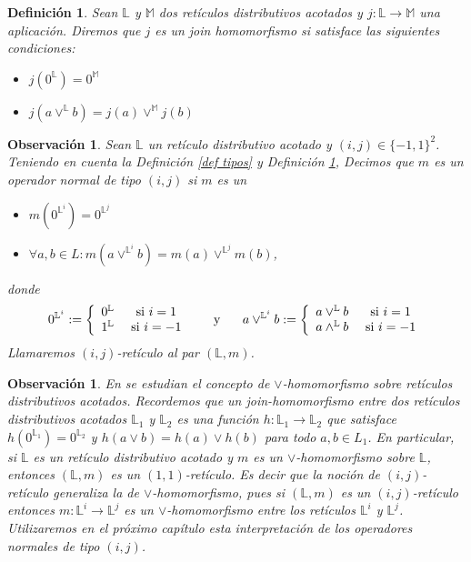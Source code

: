 \documentclass[12pt]{book}
\newtheorem{definition}[theorem]{Definición}
\newtheorem{remark}[theorem]{Observación}
\begin{document}
\begin{definition} \label{def: join homo} Sean $\mathbb{L}$ y $\mathbb{M}$ dos retículos distributivos acotados y $j \colon \mathbb{L} \to \mathbb{M}$ una aplicación. Diremos que $j$ es un \emph{join homomorfismo} si satisface las siguientes condiciones:
\begin{itemize}
\item[1.] $j(0^{\mathbb{L}}) = 0^{\mathbb{M}}$
\item[2.] $j(a \vee^{\mathbb{L}} b) = j(a) \vee^{\mathbb{M}} j(b)$
\end{itemize}
\end{definition}

\begin{remark} Sean $\mathbb{L}$ un retículo distributivo acotado y $(i,j) \in\{-1,1\}^{2}$. Teniendo en cuenta la Definición \ref{def tipos} y  Definición \ref{def: join homo}, 
Decimos que $m$ es un operador normal de tipo $(i, j)$ si $m$ es un 
\begin{itemize}
    \item[1.] $m\left(0^{\mathbb{L}^{i}}\right)=0^{\mathbb{L}^{j}}$
    \item[2.] $\forall a,b\in L: m\left(a \vee^{\mathbb{L}^{i}} b\right)= m(a) \vee^{\mathbb{L}^{j}} m(b)$,
\end{itemize}
donde 
\[ 0^{\mathbb{L}^{i}} := \left\{ \begin{array}{cc} 0^{\mathbb{L}} & \text{ si } i = 1 \\ 1^{\mathbb{L}} & \text{ si } i = -1 \end{array} \right. \hspace{0.5cm} \text{ y } \hspace{0.5cm}  a \vee^{\mathbb{L}^{i}} b := \left\{ \begin{array}{cc} a \vee^{\mathbb{L}} b & \text{ si } i = 1 \\ a \wedge^{\mathbb{L}} b & \text{ si } i = -1 \end{array} \right.  \]
Llamaremos $(i,j)$-retículo al par $(\mathbb{L},m)$.
\end{remark}

\begin{remark}\label{rem:interpretacion-ij}
En \cite{CLP} se estudian el concepto de $\vee$-homomorfismo sobre retículos distributivos acotados. Recordemos que un \emph{join-homomorfismo} entre dos retículos distributivos acotados $\mathbb{L}_1$ y $\mathbb{L}_2$ es una función $h\colon \mathbb{L}_1\to\mathbb{L}_2$ que satisface $h(0^{\mathbb{L}_1})=0^{\mathbb{L}_2}$ y $h(a\vee b)=h(a)\vee h(b)$ para todo $a,b\in L_1$. En particular, si $\mathbb{L}$ es un retículo distributivo acotado y $m$ es un $\vee$-homomorfismo sobre $\mathbb{L}$, entonces $(\mathbb{L},m)$ es un $(1,1)$-retículo. Es decir que la noción de $(i,j)$-retículo generaliza la de $\vee$-homomorfismo, pues si $(\mathbb{L},m)$ es un $(i,j)$-retículo entonces $m\colon\mathbb{L}^i\to\mathbb{L}^j$ es un $\vee$-homomorfismo entre los retículos $\mathbb{L}^i$ y $\mathbb{L}^j$. Utilizaremos en el próximo capítulo esta interpretación de los operadores normales de tipo $(i, j)$.
\end{remark}
\end{document}
